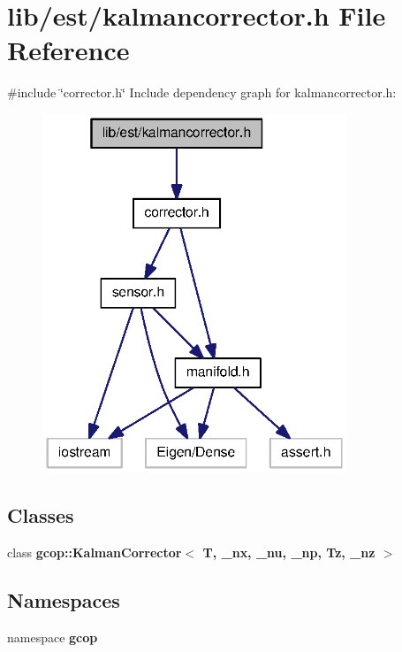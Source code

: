 \section{lib/est/kalmancorrector.h \-File \-Reference}
\label{kalmancorrector_8h}
{\ttfamily \#include \char`\"{}corrector.\-h\char`\"{}}\*
\-Include dependency graph for kalmancorrector.\-h\-:\nopagebreak
\begin{figure}[H]
\begin{center}
\leavevmode
\includegraphics[width=258pt]{kalmancorrector_8h__incl}
\end{center}
\end{figure}
\subsection*{\-Classes}
\begin{DoxyCompactItemize}
\item 
class {\bf gcop\-::\-Kalman\-Corrector$<$ T, \-\_\-nx, \-\_\-nu, \-\_\-np, Tz, \-\_\-nz $>$}
\end{DoxyCompactItemize}
\subsection*{\-Namespaces}
\begin{DoxyCompactItemize}
\item 
namespace {\bf gcop}
\end{DoxyCompactItemize}
